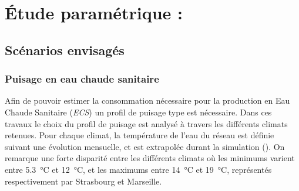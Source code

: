 











\section{Étude paramétrique :} %
\label{sec:etude_parametrique_}
\subsection{Scénarios envisagés} %
\label{sub:scenarios_envisages}
\subsubsection{Puisage en eau chaude sanitaire} %
\label{ssub:puisage_en_eau_chaude_sanitaire}

Afin de pouvoir estimer la consommation nécessaire pour la production en Eau Chaude
Sanitaire (\textit{ECS}) un profil de puisage type est nécessaire. Dans ces travaux le
choix du profil de puisage est analysé à travers les différents climats retenues. Pour
chaque climat, la température de l’eau du réseau est définie suivant une évolution
mensuelle, et est extrapolée durant la simulation (). On remarque une forte
disparité entre les différents climats où les minimums varient entre \SI{5.3}{\celsius} et
\SI{12}{\celsius}, et les maximums entre \SI{14}{\celsius} et \SI{19}{\celsius},
représentés respectivement par Strasbourg et Marseille.

